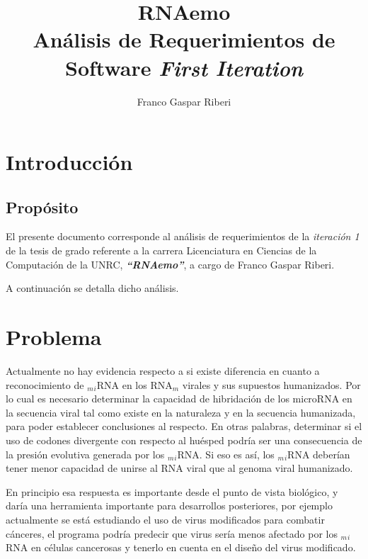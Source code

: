 \documentclass[12pt,a4paper,spanish]{article}
\title{\textbf{RNAemo}\\ \vspace{0.45cm} Análisis de Requerimientos de Software \vskip 0.6cm \emph{First Iteration}}
\author{Franco Gaspar Riberi}
\begin{document}
\maketitle\pagebreak{}\tableofcontents{}\pagebreak{}

\newpage


\section{Introducción}
\subsection{Propósito}
	\par El presente documento corresponde al análisis de requerimientos de la \emph{iteración 1} de la tesis de grado 		referente a la carrera Licenciatura en Ciencias de la Computación de la UNRC, \textit{\textbf{``RNAemo''}}, a cargo de 		Franco Gaspar Riberi.
	\par A continuación se detalla dicho análisis.

\section{Problema}
	\par Actualmente no hay evidencia respecto a si existe diferencia en cuanto a reconocimiento de $_m$$_i$RNA en los 		RNA$_m$	virales y sus supuestos humanizados. Por lo cual es necesario determinar la capacidad de hibridación de los 	microRNA en la secuencia viral tal como existe en la naturaleza y en la secuencia humanizada, para poder establecer 	conclusiones al respecto. En otras palabras, determinar si el uso de codones divergente con respecto al huésped podría 		ser una consecuencia de la presión evolutiva generada por los $_m$$_i$RNA. Si eso es así, los $_m$$_i$RNA deberían 		tener menor capacidad de unirse al RNA viral que al genoma viral humanizado. 

	\par En principio esa respuesta es importante desde el punto de vista biológico, y daría una herramienta importante 	para desarrollos posteriores, por ejemplo actualmente se está estudiando el uso de virus modificados para combatir 		cánceres, el programa podría predecir que virus sería menos afectado por los $_m$$_i$RNA en células cancerosas y 		tenerlo en cuenta en el diseño del virus modificado.
\end{document}
